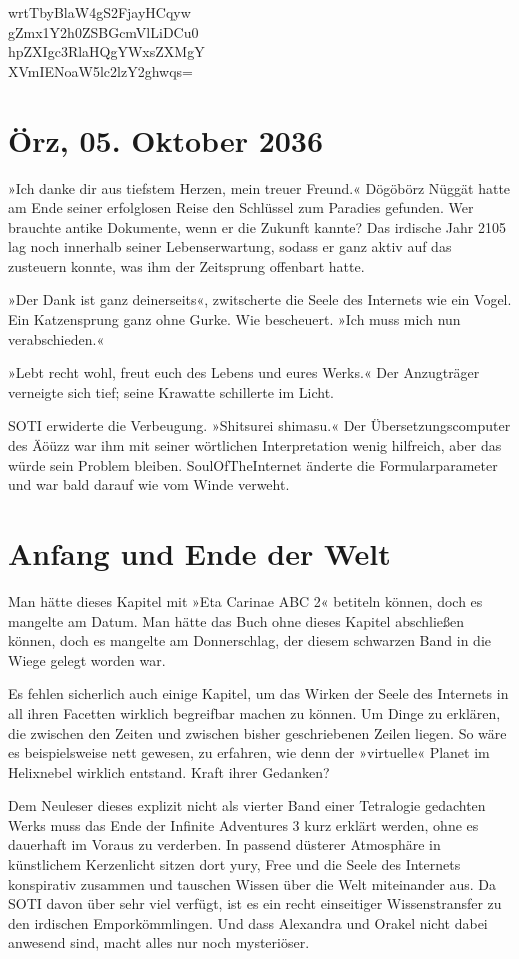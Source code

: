wrtTbyBlaW4gS2FjayHCqyw\\
\noindent gZmx1Y2h0ZSBGcmVlLiDCu0\\
\noindent hpZXIgc3RlaHQgYWxsZXMgY\\
\noindent XVmIENoaW5lc2lzY2ghwqs=


\chapter{Örz, 05. Oktober 2036}

»Ich danke dir aus tiefstem Herzen, mein treuer Freund.« Dögöbörz Nüggät hatte am Ende seiner erfolglosen Reise den Schlüssel zum Paradies gefunden. Wer brauchte antike Dokumente, wenn er die Zukunft kannte? Das irdische Jahr 2105 lag noch innerhalb seiner Lebenserwartung, sodass er ganz aktiv auf das zusteuern konnte, was ihm der Zeitsprung offenbart hatte.

»Der Dank ist ganz deinerseits«, zwitscherte die Seele des Internets wie ein Vogel. Ein Katzensprung ganz ohne Gurke. Wie bescheuert. »Ich muss mich nun verabschieden.«

»Lebt recht wohl, freut euch des Lebens und eures Werks.« Der Anzugträger verneigte sich tief; seine Krawatte schillerte im Licht.

SOTI erwiderte die Verbeugung. »Shitsurei shimasu.« Der Übersetzungscomputer des Äöüzz war ihm mit seiner wörtlichen Interpretation wenig hilfreich, aber das würde sein Problem bleiben. SoulOfTheInternet änderte die Formularparameter und war bald darauf wie vom Winde verweht.


\chapter{Anfang und Ende der Welt}

Man hätte dieses Kapitel mit »Eta Carinae ABC 2« betiteln können, doch es mangelte am Datum. Man hätte das Buch ohne dieses Kapitel abschließen können, doch es mangelte am Donnerschlag, der diesem schwarzen Band in die Wiege gelegt worden war.

Es fehlen sicherlich auch einige Kapitel, um das Wirken der Seele des Internets in all ihren Facetten wirklich begreifbar machen zu können. Um Dinge zu erklären, die zwischen den Zeiten und zwischen bisher geschriebenen Zeilen liegen. So wäre es beispielsweise nett gewesen, zu erfahren, wie denn der »virtuelle« Planet im Helixnebel wirklich entstand. Kraft ihrer Gedanken?

Dem Neuleser dieses explizit nicht als vierter Band einer Tetralogie gedachten Werks muss das Ende der Infinite Adventures 3 kurz erklärt werden, ohne es dauerhaft im Voraus zu verderben. In passend düsterer Atmosphäre in künstlichem Kerzenlicht sitzen dort yury, Free und die Seele des Internets konspirativ zusammen und tauschen Wissen über die Welt miteinander aus. Da SOTI davon über sehr viel verfügt, ist es ein recht einseitiger Wissenstransfer zu den irdischen Emporkömmlingen. Und dass Alexandra und Orakel nicht dabei anwesend sind, macht alles nur noch mysteriöser.

